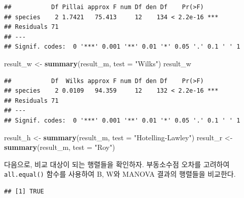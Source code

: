 \documentclass[
]{article}
\newenvironment{Shaded}{\begin{snugshade}}{\end{snugshade}}
\newcommand{\AttributeTok}[1]{\textcolor[rgb]{0.13,0.29,0.53}{#1}}
\newcommand{\FunctionTok}[1]{\textcolor[rgb]{0.13,0.29,0.53}{\textbf{#1}}}
\newcommand{\NormalTok}[1]{#1}
\newcommand{\OtherTok}[1]{\textcolor[rgb]{0.56,0.35,0.01}{#1}}
\newcommand{\SpecialCharTok}[1]{\textcolor[rgb]{0.81,0.36,0.00}{\textbf{#1}}}
\newcommand{\StringTok}[1]{\textcolor[rgb]{0.31,0.60,0.02}{#1}}
\begin{document}
\begin{verbatim}
##           Df Pillai approx F num Df den Df    Pr(>F)    
## species    2 1.7421   75.413     12    134 < 2.2e-16 ***
## Residuals 71                                            
## ---
## Signif. codes:  0 '***' 0.001 '**' 0.01 '*' 0.05 '.' 0.1 ' ' 1
\end{verbatim}

\begin{Shaded}
\begin{Highlighting}[]
\NormalTok{result\_w }\OtherTok{\textless{}{-}} \FunctionTok{summary}\NormalTok{(result\_m, }\AttributeTok{test =} \StringTok{"Wilks"}\NormalTok{)}
\NormalTok{result\_w}
\end{Highlighting}
\end{Shaded}

\begin{verbatim}
##           Df  Wilks approx F num Df den Df    Pr(>F)    
## species    2 0.0109   94.359     12    132 < 2.2e-16 ***
## Residuals 71                                            
## ---
## Signif. codes:  0 '***' 0.001 '**' 0.01 '*' 0.05 '.' 0.1 ' ' 1
\end{verbatim}

\begin{Shaded}
\begin{Highlighting}[]
\NormalTok{result\_h }\OtherTok{\textless{}{-}} \FunctionTok{summary}\NormalTok{(result\_m, }\AttributeTok{test =} \StringTok{"Hotelling{-}Lawley"}\NormalTok{)}
\NormalTok{result\_r }\OtherTok{\textless{}{-}} \FunctionTok{summary}\NormalTok{(result\_m, }\AttributeTok{test =} \StringTok{"Roy"}\NormalTok{)}
\end{Highlighting}
\end{Shaded}

다음으로, 비교 대상이 되는 행렬들을 확인하자. 부동소수점 오차를 고려하여
\texttt{all.equal()} 함수를 사용하여 B, W와 MANOVA 결과의 행렬들을
비교한다.

\begin{Shaded}
\end{Shaded}

\begin{verbatim}
## [1] TRUE
\end{verbatim}

\begin{Shaded}
\end{Shaded}
\end{document}
